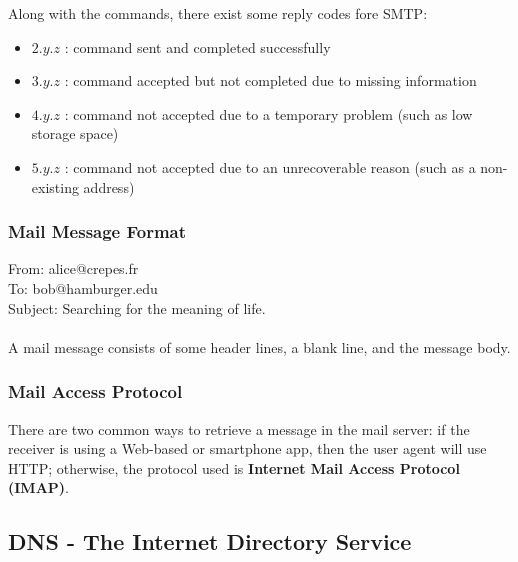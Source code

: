 \documentclass{article}
\begin{document}
Along with the commands, there exist some reply codes fore SMTP:
\begin{itemize}
    \item \textbf{$ 2.y.z $} : command sent and completed successfully
    \item \textbf{$ 3.y.z $} : command accepted but not completed due to missing information
    \item \textbf{$ 4.y.z $} : command not accepted due to a temporary problem (such as low storage space)
    \item \textbf{$ 5.y.z $} : command not accepted due to an unrecoverable reason (such as a non-existing address)
\end{itemize}
\subsubsection{Mail Message Format}
\color{gray}
From: alice@crepes.fr \\ To: bob@hamburger.edu \\ Subject: Searching for the meaning of life. \\\\
\color{black}
A mail message consists of some header lines, a blank line, and the message body.
\subsubsection{Mail Access Protocol}
There are two common ways to retrieve a message in the mail server: if the receiver is using a Web-based or smartphone app, then the user agent will use HTTP; otherwise, the protocol used is \textbf{Internet Mail Access Protocol (IMAP)}.

\subsection{DNS - The Internet Directory Service}
\end{document}
